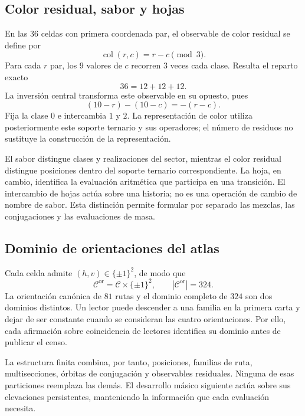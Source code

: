 \subsection{Color residual, sabor y hojas}

En las \(36\) celdas con primera coordenada par, el observable de color
residual se define por
\[
 \operatorname{col}(r,c)=r-c\pmod3.
\]
Para cada \(r\) par, los \(9\) valores de \(c\) recorren \(3\)
veces cada clase. Resulta el reparto exacto
\[
 36=12+12+12.
\]
La inversión central transforma este observable en su opuesto, pues
\[
 (10-r)-(10-c)=-(r-c).
\]
Fija la clase \(0\) e intercambia \(1\) y \(2\). La representación
de color utiliza posteriormente este soporte ternario y sus operadores;
el número de residuos no sustituye la construcción de la representación.

El sabor distingue clases y realizaciones del sector, mientras el color
residual distingue posiciones dentro del soporte ternario correspondiente.
La hoja, en cambio, identifica la evaluación aritmética que participa en
una transición. El intercambio de hojas actúa sobre una historia; no es
una operación de cambio de nombre de sabor. Esta distinción permite
formular por separado las mezclas, las conjugaciones y las evaluaciones
de masa.

\subsection{Dominio de orientaciones del atlas}

Cada celda admite \((h,v)\in\{\pm1\}^2\), de modo que
\[
 \mathcal C^{\mathrm{or}}=\mathcal C\times\{\pm1\}^2,
 \qquad |\mathcal C^{\mathrm{or}}|=324.
\]
La orientación canónica de \(81\) rutas y el dominio completo de \(324\)
son dos dominios distintos. Un lector puede descender a una familia en la
primera carta y dejar de ser constante cuando se consideran las cuatro
orientaciones. Por ello, cada afirmación sobre coincidencia de lectores
identifica su dominio antes de publicar el censo.

La estructura finita combina, por tanto, posiciones, familias de ruta,
multisecciones, órbitas de conjugación y observables residuales. Ninguna
de esas particiones reemplaza las demás. El desarrollo másico siguiente
actúa sobre sus elevaciones persistentes, manteniendo la información que
cada evaluación necesita.
